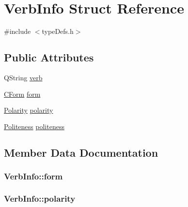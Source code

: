 \hypertarget{struct_verb_info}{}\section{Verb\+Info Struct Reference}
\label{struct_verb_info}


{\ttfamily \#include $<$type\+Defs.\+h$>$}

\subsection*{Public Attributes}
\begin{DoxyCompactItemize}
\item 
Q\+String \hyperlink{struct_verb_info_acde65c6cfad112c1811570cb325a44f8}{verb}
\item 
\hyperlink{type_defs_8h_af45f1339984167e7b556ced32eca2472}{C\+Form} \hyperlink{struct_verb_info_a0627c1bdb705b21667a027d22cefe3cf}{form}
\item 
\hyperlink{type_defs_8h_a84a045fa4024e050ca8be6d33311a054}{Polarity} \hyperlink{struct_verb_info_abc9aa0ab9b1ee7615b1ddbaf23b84edf}{polarity}
\item 
\hyperlink{type_defs_8h_ab4f7d298d5c6d08f0a7cd0fdd1ac1f2e}{Politeness} \hyperlink{struct_verb_info_a39c85beda0f6c34824f1c687b55fdc88}{politeness}
\end{DoxyCompactItemize}


\subsection{Member Data Documentation}
\subsubsection[{\texorpdfstring{form}{form}}]{ Verb\+Info\+::form}\hypertarget{struct_verb_info_a0627c1bdb705b21667a027d22cefe3cf}{}\label{struct_verb_info_a0627c1bdb705b21667a027d22cefe3cf}
\subsubsection[{\texorpdfstring{polarity}{polarity}}]{ Verb\+Info\+::polarity}\hypertarget{struct_verb_info_abc9aa0ab9b1ee7615b1ddbaf23b84edf}{}\label{struct_verb_info_abc9aa0ab9b1ee7615b1ddbaf23b84edf}
